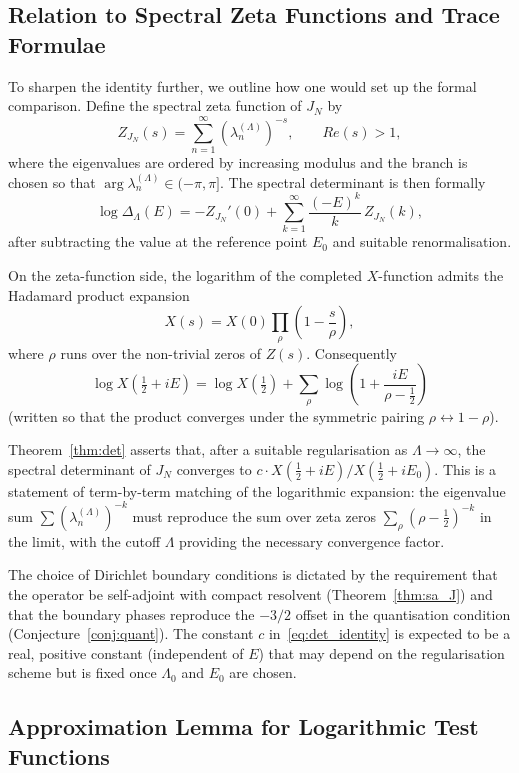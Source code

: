 \documentclass{pre-aomart}
\def\Re{Re}%
\def\zeta{Z}%
\def\xi{X}%
\theoremstyle{plain}
\theoremstyle{definition}
\theoremstyle{remark}
\begin{document}
\subsection{Relation to Spectral Zeta Functions and Trace Formulae}

To sharpen the identity further, we outline how one would set up the formal
comparison.  Define the spectral zeta function of $J_N$ by
\[
\zeta_{J_N}(s) = \sum_{n=1}^{\infty} (\lambda_n^{(\Lambda)})^{-s},
\qquad \Re(s) > 1,
\]
where the eigenvalues are ordered by increasing modulus and the branch is chosen
so that $\arg \lambda_n^{(\Lambda)} \in (-\pi, \pi]$.  The spectral determinant is
then formally
\[
\log \Delta_\Lambda(E) = -\zeta_{J_N}'(0) + \sum_{k=1}^{\infty}
\frac{(-E)^k}{k}\,\zeta_{J_N}(k),
\]
after subtracting the value at the reference point $E_0$ and suitable
renormalisation.

On the zeta-function side, the logarithm of the completed $\xi$-function admits
the Hadamard product expansion
\[
\xi(s) = \xi(0) \prod_{\rho} \left(1 - \frac{s}{\rho}\right),
\]
where $\rho$ runs over the non-trivial zeros of $\zeta(s)$.  Consequently
\[
\log \xi(\tfrac{1}{2} + iE) = \log \xi(\tfrac{1}{2}) +
\sum_{\rho} \log\!\left(1 + \frac{iE}{\rho - \tfrac{1}{2}}\right)
\]
(written so that the product converges under the symmetric pairing $\rho \leftrightarrow 1-\rho$).

Theorem~\ref{thm:det} asserts that, after a suitable regularisation as
$\Lambda \to \infty$, the spectral determinant of $J_N$ converges to
$c \cdot \xi(\frac{1}{2} + iE)/\xi(\frac{1}{2} + iE_0)$.  This is a statement of
term-by-term matching of the logarithmic expansion: the eigenvalue sum
$\sum (\lambda_n^{(\Lambda)})^{-k}$ must reproduce the sum over zeta zeros
$\sum_\rho (\rho - \frac{1}{2})^{-k}$ in the limit, with the cutoff $\Lambda$
providing the necessary convergence factor.

The choice of Dirichlet boundary conditions is dictated by the requirement that
the operator be self-adjoint with compact resolvent (Theorem~\ref{thm:sa_J})
and that the boundary phases reproduce the $-3/2$ offset in the quantisation
condition (Conjecture~\ref{conj:quant}).  The constant $c$ in~\eqref{eq:det_identity}
is expected to be a real, positive constant (independent of $E$) that may depend
on the regularisation scheme but is fixed once $\Lambda_0$ and $E_0$ are chosen.

\subsection{Approximation Lemma for Logarithmic Test Functions}
\end{document}
